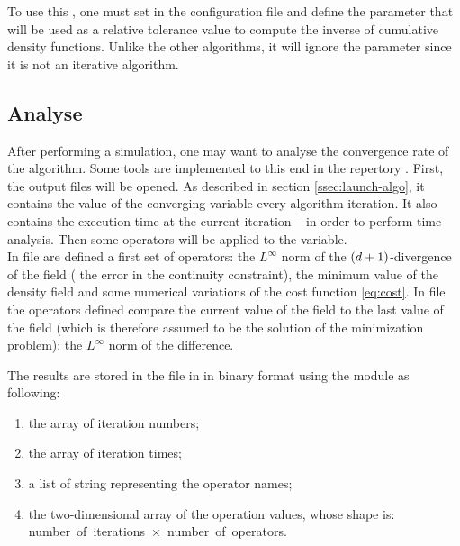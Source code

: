         To use this , one must set  in the configuration file and define the parameter
         that will be used as a relative tolerance value to compute the inverse of cumulative density functions.
        Unlike the other algorithms, it will ignore the parameter  since it is not an iterative
        algorithm.

    \subsection{Analyse\label{sssec:analyse}}
    \noindent

        After performing a simulation, one may want to analyse the convergence rate of the algorithm. Some tools are implemented
        to this end in the repertory . First, the output files will be opened. As described in section
        \ref{ssec:launch-algo}, it contains the value of the converging variable every  algorithm iteration. It
        also contains the execution time at the current iteration -- in order to perform time analysis. Then some operators
        will be applied to the variable.\\

        In file  are defined a first set of operators: the $L^\infty$ norm of the $\left(d+1\right)$-divergence of the field
        (\ie{} the error in the continuity constraint), the minimum value of the density field and some numerical variations of the cost
        function \eqref{eq:cost}. In file  the operators defined compare the current value of the field to the last
        value of the field (which is therefore assumed to be the solution of the minimization problem): the $L^\infty$ norm of the difference.

        The results are stored in the file  in  in binary format using the \cpck{} module as following:
        \begin{enumerate}
            \item the \numpy{} array of iteration numbers;
            \item the \numpy{} array of iteration times;
            \item a list of string representing the operator names;
            \item the \numpy{} two-dimensional array of the operation values, whose shape is:\\number~of~iterations~$\times$~number~of~operators.
        \end{enumerate}


